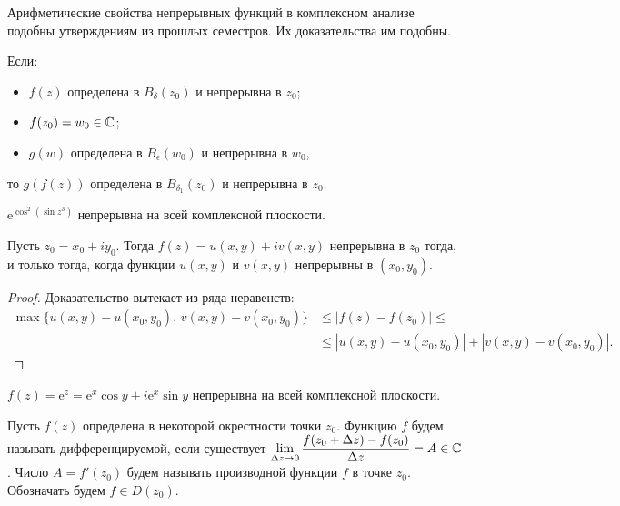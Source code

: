 \begin{note}
Арифметические свойства непрерывных функций в комплексном анализе подобны утверждениям из прошлых
семестров. Их доказательства им подобны.
\end{note}

\begin{statement}
Если:
\begin{itemize}
\item \(f(z)\) определена в \(B_\delta (z_0)\) и непрерывна в \(z_0\);
\item \(f(z_0) = w_0 \in \mathbb{C}\);
\item \(g(w)\) определена в \(B_\epsilon (w_0)\) и непрерывна в \(w_0\),
\end{itemize}
то \(g(f(z))\) определена в \(B_{\delta_1} (z_0)\) и непрерывна в \(z_0\).
\end{statement}

\begin{example}
\(\text{e}^{\cos^2{(\sin{z^3})}}\) непрерывна на всей комплексной плоскости.
\end{example}

\begin{statement}
Пусть \(z_0 = x_0 + iy_0\). Тогда \(f(z) = u(x, y) +iv(x,y)\) непрерывна в \(z_0\) тогда, и только
тогда, когда функции \(u(x, y)\) и \(v(x, y)\) непрерывны в \((x_0, y_0)\).
\end{statement}

\begin{proof}
Доказательство вытекает из ряда неравенств:
\begin{align}
    \max \{u(x,y) - u(x_0, y_0), \, v(x,y) - v(x_0, y_0)\}
    &\le |f(z) - f(z_0)| \le\\
    &\le |u(x,y) - u(x_0, y_0)| + |v(x,y) - v(x_0, y_0)|.
\end{align}
\end{proof}

\begin{example}
\(f(z) = \text{e}^z = \text{e}^x\cos{y} + i\text{e}^x\sin{y}\) непрерывна на всей комплексной
плоскости.
\end{example}



\begin{definition}
Пусть \(f(z)\) определена в некоторой окрестности точки \(z_0\). Функцию \(f\) будем называть
дифференцируемой, если существует \(\lim\limits_{\Delta z \to 0}
\dfrac{f(z_0 + \Delta z) - f(z_0)}{\Delta z} = A \in \mathbb{C}\). Число \(A = f'(z_0)\) будем называть
производной функции \(f\) в точке \(z_0\). Обозначать будем \(f \in D(z_0)\).
\end{definition}

